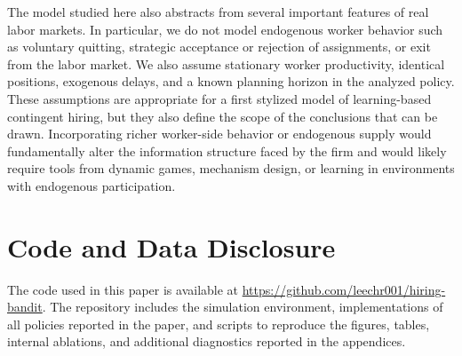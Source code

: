 \documentclass[opre,blindrev]{informs3}
\begin{document}
The model studied here also abstracts from several important features of real labor markets. In particular, we do not model endogenous worker behavior such as voluntary quitting, strategic acceptance or rejection of assignments, or exit from the labor market. We also assume stationary worker productivity, identical positions, exogenous delays, and a known planning horizon in the analyzed policy. These assumptions are appropriate for a first stylized model of learning-based contingent hiring, but they also define the scope of the conclusions that can be drawn. Incorporating richer worker-side behavior or endogenous supply would fundamentally alter the information structure faced by the firm and would likely require tools from dynamic games, mechanism design, or learning in environments with endogenous participation.



\section{Code and Data Disclosure}\label{sec:code-data-disclosure}
The code used in this paper is available at \url{https://github.com/leechr001/hiring-bandit}. The repository includes the simulation environment, implementations of all policies reported in the paper, and scripts to reproduce the figures, tables, internal ablations, and additional diagnostics reported in the appendices. 





%
%
%
\end{document}
